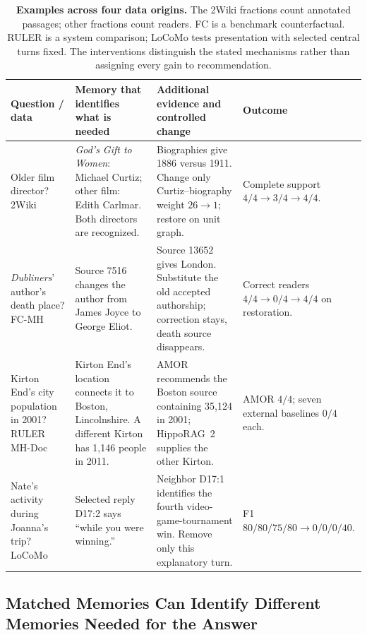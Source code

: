 \begin{table}[!t]
\centering
\small
\setlength{\tabcolsep}{4pt}
\begin{tabular}{>{\raggedright\arraybackslash}p{}>{\raggedright\arraybackslash}p{}>{\raggedright\arraybackslash}p{}>{\raggedright\arraybackslash}p{}}
\toprule
Question / data & Memory that identifies what is needed & Additional evidence and controlled change & Outcome \\
\midrule
Older film director?\newline 2Wiki & \emph{God's Gift to Women}: Michael Curtiz; other film: Edith Carlmar. Both directors are recognized. & Biographies give 1886 versus 1911. Change only Curtiz--biography weight $26\to1$; restore on unit graph. & Complete support $4/4\to3/4\to4/4$. \\
\addlinespace[3pt]
\emph{Dubliners}' author's death place?\newline FC-MH & Source 7516 changes the author from James Joyce to George Eliot. & Source 13652 gives London. Substitute the old accepted authorship; correction stays, death source disappears. & Correct readers $4/4\to0/4\to4/4$ on restoration. \\
\addlinespace[3pt]
Kirton End's city population in 2001?\newline RULER MH-Doc & Kirton End's location connects it to Boston, Lincolnshire. A different Kirton has 1,146 people in 2011. & AMOR recommends the Boston source containing 35,124 in 2001; HippoRAG~2 supplies the other Kirton. & AMOR $4/4$; seven external baselines $0/4$ each. \\
\addlinespace[3pt]
Nate's activity during Joanna's trip?\newline LoCoMo & Selected reply D17:2 says ``while you were winning.'' & Neighbor D17:1 identifies the fourth video-game-tournament win. Remove only this explanatory turn. & F1 $80/80/75/80\to0/0/0/40$. \\
\bottomrule
\end{tabular}
\caption{\textbf{Examples across four data origins.} The 2Wiki fractions count annotated passages; other fractions count readers. FC is a benchmark counterfactual. RULER is a system comparison; LoCoMo tests presentation with selected central turns fixed. The interventions distinguish the stated mechanisms rather than assigning every gain to recommendation.}
\label{tab:memory-examples}
\end{table}

\subsection{Matched Memories Can Identify Different Memories Needed for the Answer}

